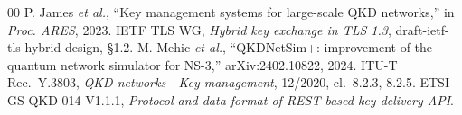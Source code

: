 \documentclass[conference]{IEEEtran}
\begin{document}
\begin{thebibliography}{00}
 P. James \emph{et al.}, ``Key management systems for large-scale QKD networks,'' in \emph{Proc. ARES}, 2023. %
 IETF TLS WG, \emph{Hybrid key exchange in TLS 1.3}, draft-ietf-tls-hybrid-design, \S1.2.
 M. Mehic \emph{et al.}, ``QKDNetSim+: improvement of the quantum network simulator for NS-3,'' arXiv:2402.10822, 2024.
 ITU-T Rec.~Y.3803, \emph{QKD networks---Key management}, 12/2020, cl.~8.2.3, 8.2.5.
 ETSI GS QKD 014 V1.1.1, \emph{Protocol and data format of REST-based key delivery API}.
\end{thebibliography}
\end{document}
